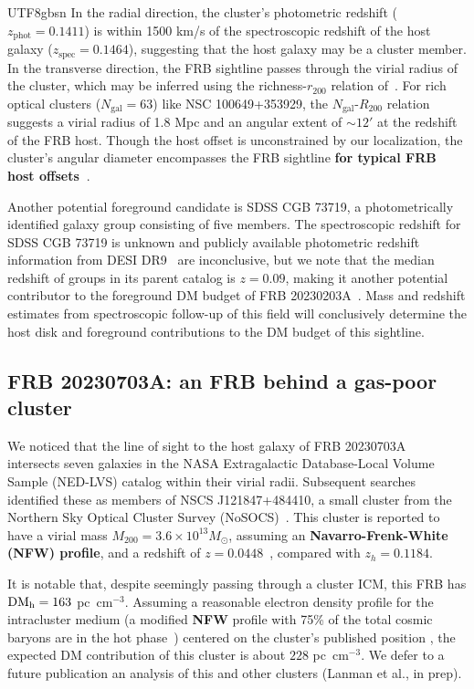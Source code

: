 \documentclass[twocolumn,linenumbers]{aastex631}
\newcommand{\msbold}[1]{\textbf{#1}}
\newcommand{\dmh}{\ensuremath{{\rm DM}_\textrm{h}}}
\begin{document}
\begin{CJK*}{UTF8}{gbsn}
In the radial direction, the cluster's photometric redshift ($z_{\textrm{phot}} = 0.1411$) is within 1500 km/s of the spectroscopic redshift of the host galaxy ($z_\mathrm{spec} = 0.1464$), suggesting that the host galaxy may be a cluster member. In the transverse direction, the FRB sightline passes through the virial radius of the cluster, which may be inferred using the richness-$r_{200}$ relation of~\citet{gal2009northern}. For rich optical clusters ($N_\textrm{gal} = 63$) like NSC 100649+353929, the $N_\textrm{gal}$-$R_{200}$ relation suggests a virial radius of 1.8 Mpc and an angular extent of $\sim12'$ at the redshift of the FRB host. Though the host offset is unconstrained by our localization, the cluster's angular diameter encompasses the FRB sightline \msbold{for typical FRB host offsets~\citep[$\sim 3$ kpc, see][]{heintz2020host}}.

Another potential foreground candidate is SDSS CGB 73719, a photometrically identified galaxy group consisting of five members. The spectroscopic redshift for SDSS CGB 73719 is unknown and publicly available photometric redshift information from DESI DR9~\citep{zhou2023target} are inconclusive, but we note that the median redshift of groups in its parent catalog is $z = 0.09$, making it another potential contributor to the foreground DM budget of FRB 20230203A~\citep{mcconnachie2009compact}. Mass and redshift estimates from spectroscopic follow-up of this field will conclusively determine the host disk and foreground contributions to the DM budget of this sightline.

\subsection{FRB 20230703A: an FRB behind a gas-poor cluster}\label{sec:FRB20230703A}
We noticed that the line of sight to the host galaxy of FRB 20230703A~\citep{2023ApJS..268...14C} intersects seven galaxies in the NASA Extragalactic Database-Local Volume Sample (NED-LVS) catalog within their virial radii. Subsequent searches identified these as members of NSCS J121847+484410, a small cluster from the Northern Sky Optical Cluster Survey (NoSOCS)~\citep{2000AJ....119...12G}. This cluster is reported to have a virial mass $M_{200} = 3.6\times 10^{13} M_\odot$, assuming an \msbold{Navarro-Frenk-White (NFW) profile}, and a redshift of $z = 0.0448$~\citep{2009MNRAS.392..135L}, compared with $z_h = 0.1184$.

It is notable that, despite seemingly passing through a cluster ICM, this FRB has $\dmh=163~$pc~cm$^{-3}$. Assuming a reasonable electron density profile for the intracluster medium (a modified \msbold{NFW} profile with 75\% of the total cosmic baryons are in the hot phase~\citep{prochaska2019probing}) centered on the cluster's published position%
, the expected DM contribution of this cluster is about $228$ pc~cm$^{-3}$. We defer to a future publication an analysis of this and other clusters (Lanman et al., in prep).


\end{CJK*}
\end{document}
